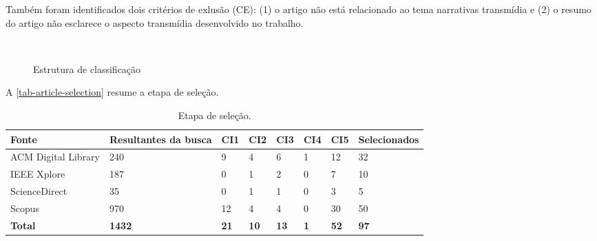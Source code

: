 \documentclass[
article,			%
11pt,				%
oneside,			%
a4paper,			%
english,			%
brazil,				%
sumario=tradicional
]{abntex2}
\begin{document}
  Também foram identificados dois critérios de exlusão (CE): (1) o artigo não está relacionado ao tema narrativas transmídia e (2) o resumo do artigo não esclarece o aspecto transmídia desenvolvido no trabalho.

  \begin{figure}[htb]
    \caption{\label{diag-trata-de-para}Estrutura de classificação}
    \begin{center}
       \\
    \end{center}
  \end{figure}

  A \autoref{tab-article-selection} resume a etapa de seleção.

  \begin{table}[htb]
    \ABNTEXfontereduzida
    \caption[Etapa de seleção]{Etapa de seleção.}
    \label{tab-article-selection}
    \begin{tabular}{p{3.0cm}|p{2.0cm}|p{1.0cm}|p{1.0cm}|p{1.0cm}|p{1.0cm}|p{1.0cm}|p{2.0cm}}
      \textbf{Fonte} & \textbf{Resultantes da busca} & \textbf{CI1} & \textbf{CI2} & \textbf{CI3} & \textbf{CI4} & \textbf{CI5} & \textbf{Selecionados}  \\
      \hline
      ACM Digital Library & 240 & 9 & 4 & 6 & 1 & 12 & 32 \\
      \hline
      IEEE Xplore & 187 & 0 & 1 & 2 & 0 & 7 & 10 \\
      \hline
      ScienceDirect & 35 & 0 & 1 & 1 & 0 & 3 & 5 \\
      \hline
      Scopus & 970 & 12 & 4 & 4 & 0 & 30 & 50 \\
      \hline
      \textbf{Total} & \textbf{1432} & \textbf{21} & \textbf{10} & \textbf{13} & \textbf{1} & \textbf{52} & \textbf{97} \\
    \end{tabular}
  \end{table}
\end{document}
